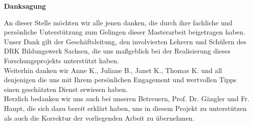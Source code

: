 \vspace*{\fill}
\begin{center}
\textbf{Danksagung}
\end{center}

\noindent 
An dieser Stelle möchten wir alle jenen danken, die durch ihre fachliche und persönliche Unterstützung zum Gelingen dieser Masterarbeit beigetragen haben.\\[0,5cm]
Unser Dank gilt der Geschäftsleitung, den involvierten Lehrern und Schülern des DRK Bildungswerk Sachsen, die uns maßgeblich bei der Realisierung dieses Forschungsprojekts unterstützt haben.\\[0,5cm]
Weiterhin danken wir Anne K., Juliane B., Janet K., Thomas K. und all denjenigen die uns mit Ihrem persönlichen Engagement und wertvollen Tipps einen geschätzten Dienst erwiesen haben.\\[0,5cm]
Herzlich bedanken wir uns auch bei unseren Betreuern, Prof. Dr. Gängler und Fr. Haupt, die sich dazu bereit erklärt haben, uns in diesem Projekt zu unterstützen als auch die Korrektur der vorliegenden Arbeit zu übernehmen.
\vspace{\fill}